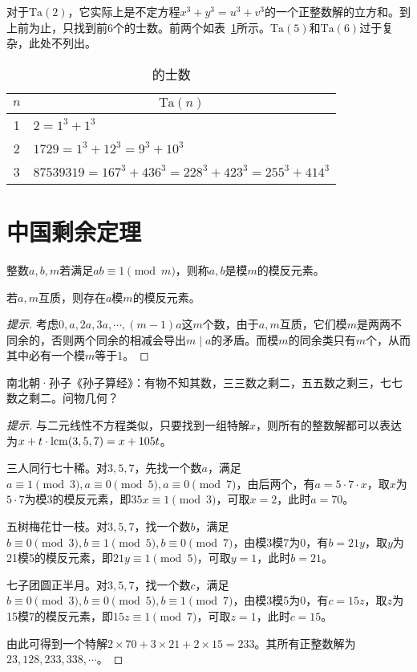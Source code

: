 对于$\mathrm{Ta}(2)$，它实际上是不定方程$x^3+y^3=u^3+v^3$的一个正整数解的立方和。到上前为止，只找到前6个的士数。前两个如表~\ref{tab:taxicab-number}所示。$\mathrm{Ta}(5)$和$\mathrm{Ta}(6)$过于复杂，此处不列出。
\begin{table}[htbp]
  \centering
  \begin{tabular}{cl}
    \toprule
    $n$              & \multicolumn{1}{c}{$\mathrm{Ta}(n)$}\\\midrule
    1                & $2 = 1^3 + 1^3$\\
    2                & $1729=1^3+12^3=9^3+10^3$\\
    3                & $87539319=167^3+436^3=228^3+423^3=255^3+414^3$\\
    \bottomrule
  \end{tabular}
  \caption{的士数}
  \label{tab:taxicab-number}
\end{table}

\section{中国剩余定理}
\label{sec:Chinese-remainder-theorem}

\begin{definition}
  整数$a,b,m$若满足$ab\equiv1\pmod m$，则称$a,b$是模$m$的模反元素。
\end{definition}

\begin{theorem}[模反的存在性]
  若$a,m$互质，则存在$a$模$m$的模反元素。
\end{theorem}
\begin{proof}[提示]
  考虑$0,a,2a,3a,\cdots,(m-1)a$这$m$个数，由于$a,m$互质，它们模$m$是两两不同余的，否则两个同余的相减会导出$m\mid a$的矛盾。而模$m$的同余类只有$m$个，从而其中必有一个模$m$等于1。
\end{proof}

\begin{example}
  南北朝·孙子《孙子算经》：有物不知其数，三三数之剩二，五五数之剩三，七七数之剩二。问物几何？
\end{example}
\begin{proof}[提示]
  与二元线性不方程类似，只要找到一组特解$x$，则所有的整数解都可以表达为$x+t\cdot\mathrm{lcm}(3,5,7)=x+105t$。

  三人同行七十稀。对$3,5,7$，先找一个数$a$，满足$a\equiv 1\pmod3, a\equiv0\pmod5, a\equiv0\pmod7$，由后两个，有$a=5\cdot7\cdot x$，取$x$为$5\cdot 7$为模$3$的模反元素，即$35x\equiv1\pmod3$，可取$x=2$，此时$a=70$。

  五树梅花廿一枝。对$3,5,7$，找一个数$b$，满足$b\equiv0\pmod3, b\equiv1\pmod5,b\equiv0\pmod7$，由模3模7为0，有$b=21y$，取$y$为21模5的模反元素，即$21y\equiv1\pmod5$，可取$y=1$，此时$b=21$。

  七子团圆正半月。对$3,5,7$，找一个数$c$，满足$b\equiv0\pmod3, b\equiv0\pmod5,b\equiv1\pmod7$，由模3模5为0，有$c=15z$，取$z$为15模7的模反元素，即$15z\equiv1\pmod7$，可取$z=1$，此时$c=15$。

  由此可得到一个特解$2\times 70+3\times 21+2\times 15=233$。其所有正整数解为$23,128,233,338,\cdots$。
\end{proof}

